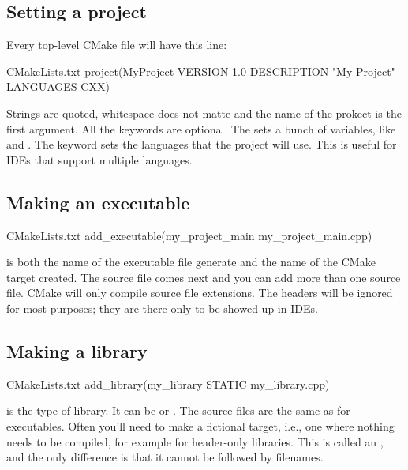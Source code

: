 \subsection{Setting a project}
Every top-level CMake file will have this line:
\begin{neonlisting}[language=C++]{CMakeLists.txt}
    project(MyProject VERSION 1.0
        DESCRIPTION "My Project"
        LANGUAGES CXX)

\end{neonlisting}

Strings are quoted, whitespace does not matte and the name of the prokect is the first argument.
All the keywords are optional. The  sets a bunch of variables, like  
and . The  keyword sets the languages that the project will use. This is useful for IDEs that support multiple languages.

\subsection{Making an executable}

\begin{neonlisting}[language=C++]{CMakeLists.txt}
    add_executable(my_project_main my_project_main.cpp)
\end{neonlisting}

 is both the name of the executable file generate and the name of the CMake target created.
The source file comes next and you can add more than one source file. CMake will only compile source file extensions. 
The headers will be ignored for most purposes; they are there only to be showed up in IDEs.

\subsection{Making a library}

\begin{neonlisting}[language=C++]{CMakeLists.txt}
    add_library(my_library STATIC my_library.cpp)
\end{neonlisting}

 is the type of library. It can be  or . The source files are the same as for executables.
Often you'll need to make a fictional target, i.e., one where nothing needs to be compiled, for example for header-only libraries. This is called an ,
and the only difference is that it cannot be followed by filenames.

